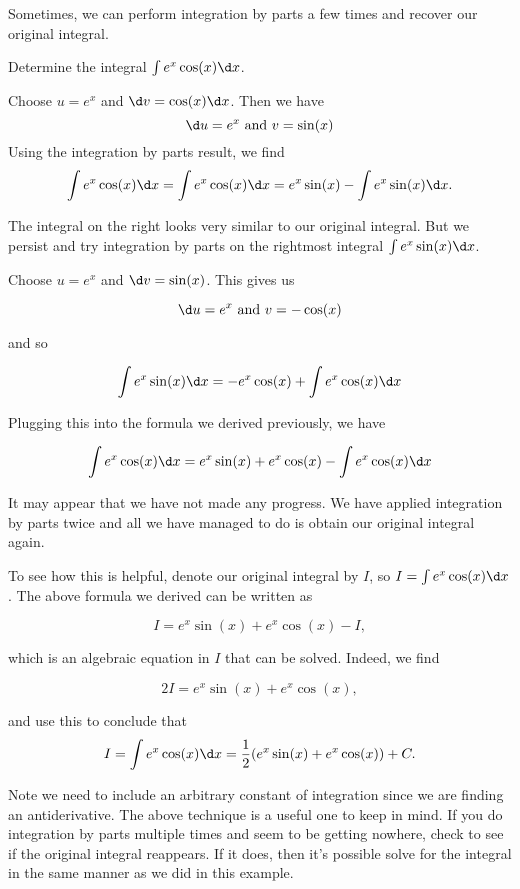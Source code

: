 \documentclass{ximera}
\begin{document}
Sometimes, we can perform integration by parts a few times and recover our original integral.

\begin{example}
Determine the integral $\int e^{x}\cos(x) \d x$.
\begin{explanation}

Choose $u=e^{x}$ and $\d v=\cos(x) \d x$. 
Then we have 
\[
\d u =e^{x} \text{ and }  v=\sin(x) 
\]
Using the integration by parts result, we find
\[
\int e^{x}\cos(x) \d x = \int e^{x} \cos(x) \d x= e^{x} \sin(x) - \int e^{x} \sin(x) \d x.
\]

The integral on the right looks very similar to our original integral. But we persist and try integration by parts on the rightmost integral $\int e^{x} \sin(x) \d x$. 

Choose $u=e^{x}$ and $\d v= \sin(x)$. 
This gives us 

\[
\d u=e^{x} \text{ and } v=-\cos(x)
\]

and so 

\[
\int e^{x}\sin(x) \d x= -e^{x}\cos(x) + \int e^{x} \cos(x) \d x
\]

Plugging this into the formula we derived previously, we have

\[ 
\int e^{x} \cos(x) \d x=e^{x} \sin(x)+e^{x} \cos(x) - \int e^{x} \cos(x) \d x
\]

It may appear that we have not made any progress. We have applied integration by parts twice and all we have managed to do is obtain our original integral again.

To see how this is helpful, denote our original integral by $I$, so $I=\int e^{x} \cos(x) \d x$. The above formula we derived can be written as 

\[
 I = e^{x} \sin(x) +e^{x} \cos(x) -I,
\] 

which is an algebraic equation in $I$ that can be solved. Indeed, we find

\[
 2I = e^{x} \sin(x) +e^{x} \cos(x),
\] 

and use this to conclude that
\[
 I=\int e^{x}\cos(x) \d x= \frac{1}{2} ( e^{x} \sin(x) +e^{x} \cos(x) ) + C.
\]

Note we need to include an arbitrary constant of integration since we are finding an antiderivative. The above technique is a useful one to keep in mind. If you do integration by parts multiple times and seem to be getting nowhere, check to see if the original integral reappears.  If it does, then it's possible solve for the integral in the same manner as we did in this example. 
\end{explanation}
\end{example}
\end{document}
